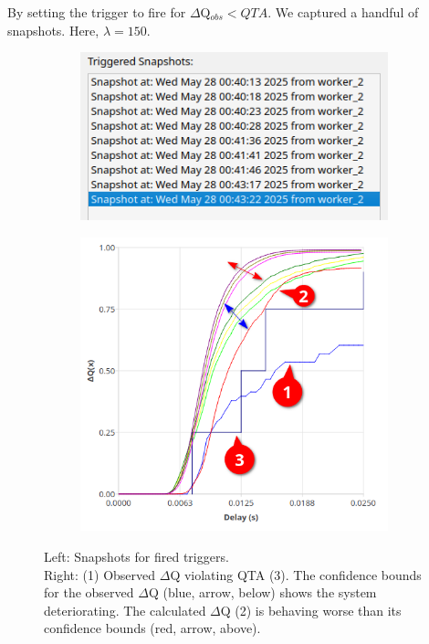             By setting the trigger to fire for $\Delta$Q$_{obs} < QTA$. We captured a handful of snapshots. Here, $\lambda = 150$.
        
        \begin{figure}[H]
            \centering
            \begin{subfigure}{.5\textwidth}
                \centering
                \includegraphics[width=0.98\textwidth]{img/overload_2/snapshots.png}
                \label{fig:high_load_1}
            \end{subfigure}%
            \begin{subfigure}{.5\textwidth}
                \centering
                \includegraphics[width =0.98\textwidth]{img/overload_2/qta_triggerd2.png}
                \label{fig:high_load_2}
            \end{subfigure}
            \label{fig:early_ov}
            \caption{Left: Snapshots for fired triggers. \\
            Right: (1) Observed $\Delta$Q violating QTA (3). The confidence bounds for the observed $\Delta$Q (blue, arrow, below) shows the system deteriorating. The calculated $\Delta$Q (2) is behaving worse than its confidence bounds (red, arrow, above).} %
        \end{figure}

